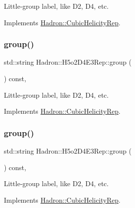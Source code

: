 Little-\/group label, like D2, D4, etc. 

Implements \mbox{\hyperlink{structHadron_1_1CubicHelicityRep_a101a7d76cd8ccdad0f272db44b766113}{Hadron\+::\+Cubic\+Helicity\+Rep}}.

\mbox{\label{structHadron_1_1H5o2D4E3Rep_a5761659c1554a5eadb627eb60ce49afa}} 
\subsubsection{\texorpdfstring{group()}{group()}\hspace{0.1cm}{\footnotesize\ttfamily [2/3]}}
{\footnotesize\ttfamily std\+::string Hadron\+::\+H5o2\+D4\+E3\+Rep\+::group (\begin{DoxyParamCaption}{ }\end{DoxyParamCaption}) const\hspace{0.3cm}{\ttfamily [inline]}, {\ttfamily [virtual]}}

Little-\/group label, like D2, D4, etc. 

Implements \mbox{\hyperlink{structHadron_1_1CubicHelicityRep_a101a7d76cd8ccdad0f272db44b766113}{Hadron\+::\+Cubic\+Helicity\+Rep}}.

\mbox{\label{structHadron_1_1H5o2D4E3Rep_a5761659c1554a5eadb627eb60ce49afa}} 
\subsubsection{\texorpdfstring{group()}{group()}\hspace{0.1cm}{\footnotesize\ttfamily [3/3]}}
{\footnotesize\ttfamily std\+::string Hadron\+::\+H5o2\+D4\+E3\+Rep\+::group (\begin{DoxyParamCaption}{ }\end{DoxyParamCaption}) const\hspace{0.3cm}{\ttfamily [inline]}, {\ttfamily [virtual]}}

Little-\/group label, like D2, D4, etc. 

Implements \mbox{\hyperlink{structHadron_1_1CubicHelicityRep_a101a7d76cd8ccdad0f272db44b766113}{Hadron\+::\+Cubic\+Helicity\+Rep}}.

